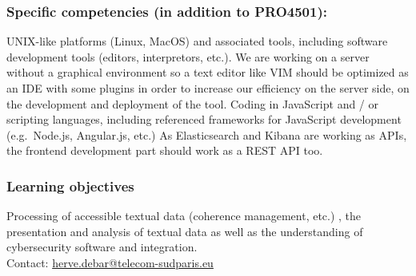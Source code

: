 \subsubsection{Specific competencies (in addition to PRO4501):}
UNIX-like platforms (Linux, MacOS) and associated tools, including
software development tools (editors, interpretors, etc.). We are working on a
server without a graphical environment so a text editor like VIM should be
optimized as an IDE with some plugins in order to increase our efficiency on the 
server side, on the development and deployment of the tool. 
Coding in JavaScript and / or scripting languages, including referenced 
frameworks for JavaScript development (e.g.~Node.js, Angular.js, etc.)
As Elasticsearch and Kibana are working as APIs, the frontend development part should work
as a REST API too.

\subsubsection{Learning objectives}
Processing of accessible textual data (coherence management, etc.)
, the presentation and analysis of textual data as well as the understanding of cybersecurity
software and integration. \\
Contact: \url{herve.debar@telecom-sudparis.eu} 

%
%


